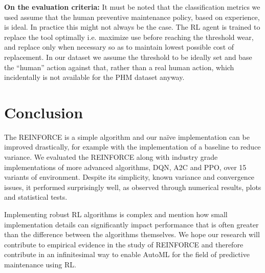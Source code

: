 \documentclass[a4paper, 12pt]{article}
\begin{document}
\textbf{On the evaluation criteria:} It must be noted that the classification metrics we used assume that the human preventive maintenance policy, based on experience, is ideal. In practice this might not always be the case. The RL agent is trained to replace the tool optimally i.e. maximize use before reaching the threshold wear, and replace only when necessary so as to maintain lowest possible cost of replacement. In our dataset we assume the threshold to be ideally set and base the ``human'' action against that, rather than a real human action, which incidentally is not available for the PHM dataset anyway.


 

\section{Conclusion}\label{sec:Conclusion}
The REINFORCE is a simple algorithm and our na\"ive implementation can be improved drastically, for example with the implementation of a baseline to reduce variance. We evaluated the REINFORCE along with industry grade implementations of more advanced algorithms, DQN, A2C and PPO, over 15 variants of environment. Despite its simplicity, known variance and convergence issues, it performed surprisingly well, as observed through numerical results, plots and statistical tests. 

Implementing robust RL algorithms is complex and \cite{SB3-paper} mention how small implementation details can significantly impact performance that is often greater than the difference between the algorithms themselves. We hope our research will contribute to empirical evidence in the study of REINFORCE and therefore contribute in an infinitesimal way to enable AutoML for the field of predictive maintenance using RL. %

\singlespacing


\end{document}
